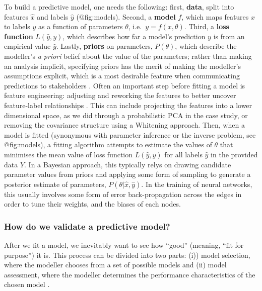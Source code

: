 To build a predictive model, one needs the following: first,
\textbf{data}, split into features \(\hat{x}\) and labels \(\hat{y}\)
(@fig:models). Second, a \textbf{model} \(f\), which maps features \(x\)
to labels \(y\) as a function of parameters \(\theta\),
i.e.~\(y = f(x, \theta)\). Third, a \textbf{loss function}
\(L(\hat{y}, y)\), which describes how far a model's prediction \(y\) is
from an empirical value \(\hat{y}\). Lastly, \textbf{priors} on
parameters, \(P(\theta)\), which describe the modeller's \emph{a priori}
belief about the value of the parameters; rather than making an analysis
implicit, specifying priors has the merit of making the modeller's
assumptions explicit, which is a most desirable feature when
communicating predictions to stakeholders
\cite{Spiegelhalter2000BayMet}. Often an important step before fitting a
model is feature engineering: adjusting and reworking the features to
better uncover feature-label relationships \cite{Kuhn2019FeaEng}. This
can include projecting the features into a lower dimensional space, as
we did through a probabilistic PCA in the case study, or removing the
covariance structure using a Whitening approach. Then, when a model is
fitted (synonymous with parameter inference or the inverse problem, see
@fig:models), a fitting algorithm attempts to estimate the values of
\(\theta\) that minimises the mean value of loss function
\(L(\hat{y},y)\) for all labels \(\hat{y}\) in the provided data \(Y\).
In a Bayesian approach, this typically relys on drawing candidate
parameter values from priors and applying some form of sampling to
generate a posterior estimate of parameters,
\(P(\theta | \hat{x}, \hat{y})\). In the training of neural networks,
this usually involves some form of error back-propagation across the
edges in order to tune their weights, and the biases of each nodes.

\subsubsection{How do we validate a predictive
model?}\label{how-do-we-validate-a-predictive-model}

After we fit a model, we inevitably want to see how ``good'' (meaning,
``fit for purpose'') it is. This process can be divided into two parts:
(i)) model selection, where the modeller chooses from a set of possible
models and (ii) model assessment, where the modeller determines the
performance characteristics of the chosen model \cite{Hastie2009EleSta}.

